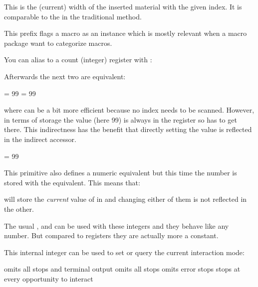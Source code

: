 \startnewprimitive[title={\prm {insertwidth}}]

This is the (current) width of the inserted material with the given index. It is
comparable to the  in the traditional method.

\stopnewprimitive

\startnewprimitive[title={\prm {instance}}]

This prefix flags a macro as an instance which is mostly relevant when a macro
package want to categorize macros.

\stopnewprimitive

\startnewprimitive[title={\prm {integerdef}}]

You can alias to a count (integer) register with :

\starttyping
\countdef{}
\stoptyping

Afterwards the next two are equivalent:

\starttyping
\MyCount   = 99
 = 99
\stoptyping

where \type {\MyCount} can be a bit more efficient because no index needs to be
scanned. However, in terms of storage the value (here 99) is always in the register
so \type {\MyCount} has to get there. This indirectness has the benefit that directly
setting the value is reflected in the indirect accessor.

\starttyping
\integerdef\MyCount = 99
\stoptyping

This primitive also defines a numeric equivalent but this time the number is stored
with the equivalent. This means that:

\starttyping
\let\MyCopyOfCount = \MyCount
\stoptyping

will store the {\em current} value of \type {\MyCount} in \type {\MyCopyOfCount} and
changing either of them is not reflected in the other.

The usual ,  and  can be used with these
integers and they behave like any number. But compared to registers they are actually
more a constant.

\stopnewprimitive

\startoldprimitive[title={\prm {interactionmode}}]

This internal integer can be used to set or query the current interaction mode:

\starttabulate[||||]
\NC \type {\batchmode    } \NC \the\batchmodecode     \NC omits all stops and terminal output \NC \NR
\NC \type {\nonstopmode  } \NC \the\nonstopmodecode   \NC omits all stops \NC \NR
\NC \type {\scrollmode   } \NC \the\scrollmodecode    \NC omits error stops \NC \NR
\NC \type {\errorstopmode} \NC \the\errorstopmodecode \NC stops at every opportunity to interact \NC \NR
\stoptabulate

